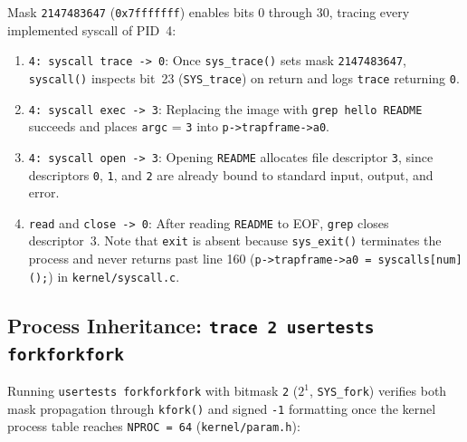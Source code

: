 \documentclass[12pt,a4paper]{article}
\begin{document}
Mask \texttt{2147483647} (\texttt{0x7fffffff}) enables bits 0 through 30, tracing every implemented syscall of PID~4:
\begin{enumerate}
    \item \texttt{4: syscall trace -> 0}: Once \texttt{sys\_trace()} sets mask \texttt{2147483647}, \texttt{syscall()} inspects bit~23 (\texttt{SYS\_trace}) on return and logs \texttt{trace} returning \texttt{0}.
    \item \texttt{4: syscall exec -> 3}: Replacing the image with \texttt{grep hello README} succeeds and places \texttt{argc} = \texttt{3} into \texttt{p->trapframe->a0}.
    \item \texttt{4: syscall open -> 3}: Opening \texttt{README} allocates file descriptor \texttt{3}, since descriptors \texttt{0}, \texttt{1}, and \texttt{2} are already bound to standard input, output, and error.
    \item \texttt{read} and \texttt{close -> 0}: After reading \texttt{README} to EOF, \texttt{grep} closes descriptor~3. Note that \texttt{exit} is absent because \texttt{sys\_exit()} terminates the process and never returns past line 160 (\texttt{p->trapframe->a0 = syscalls[num]();}) in \texttt{kernel/syscall.c}.
\end{enumerate}

\subsection{Process Inheritance: \texttt{trace 2 usertests forkforkfork}}
Running \texttt{usertests forkforkfork} with bitmask \texttt{2} ($2^1$, \texttt{SYS\_fork}) verifies both mask propagation through \texttt{kfork()} and signed \texttt{-1} formatting once the kernel process table reaches \texttt{NPROC = 64} (\texttt{kernel/param.h}):
\end{document}
